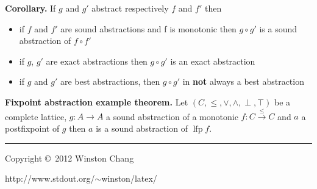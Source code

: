 \documentclass[10pt,landscape]{article}
\begin{document}
\begin{multicols}{3}
\textbf{Corollary.} If $g$ and $g'$ abstract respectively $f$ and $f'$ then
\begin{itemize}\setlength{\itemsep}{-0.7mm}
\item if $f$ and $f'$ are sound abstractions and f is monotonic then $g \circ g'$ is a sound abstraction of $f \circ f'$
\item if $g$, $g'$ are exact abstractions then $g \circ g'$ is an exact abstraction
\item if $g$ and $g'$ are best abstractions, then $g \circ g'$ in \textbf{not} always a best abstraction
\end{itemize}

\textbf{Fixpoint abstraction example theorem.} Let $(C, \leq, \vee, \wedge, \perp, \top)$ be a complete lattice, $g : A \rightarrow A$ a sound abstraction of a monotonic $f : C \overset{\leq}{\rightarrow} C$ and $a$ a postfixpoint of $g$ then $a$ is a sound abstraction of $\operatorname{lfp} f$.




\rule{0.3\linewidth}{0.25pt}
\scriptsize

Copyright \copyright\ 2012 Winston Chang

http://www.stdout.org/$\sim$winston/latex/


\end{multicols}
\end{document}
